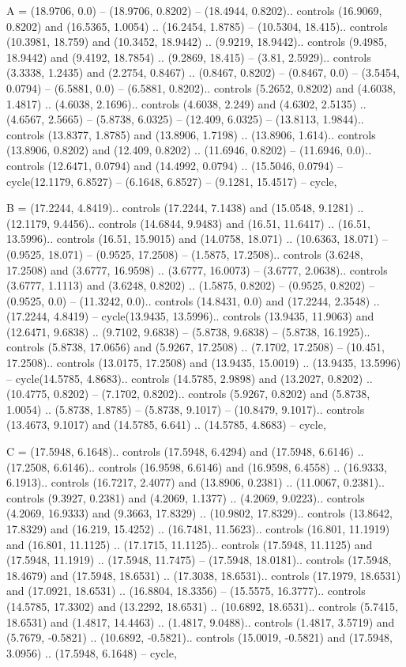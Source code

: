 A = {(18.9706, 0.0) -- (18.9706, 0.8202) -- (18.4944, 0.8202).. controls (16.9069, 0.8202) and (16.5365, 1.0054) .. (16.2454, 1.8785) -- (10.5304, 18.415).. controls (10.3981, 18.759) and (10.3452, 18.9442) .. (9.9219, 18.9442).. controls (9.4985, 18.9442) and (9.4192, 18.7854) .. (9.2869, 18.415) -- (3.81, 2.5929).. controls (3.3338, 1.2435) and (2.2754, 0.8467) .. (0.8467, 0.8202) -- (0.8467, 0.0) -- (3.5454, 0.0794) -- (6.5881, 0.0) -- (6.5881, 0.8202).. controls (5.2652, 0.8202) and (4.6038, 1.4817) .. (4.6038, 2.1696).. controls (4.6038, 2.249) and (4.6302, 2.5135) .. (4.6567, 2.5665) -- (5.8738, 6.0325) -- (12.409, 6.0325) -- (13.8113, 1.9844).. controls (13.8377, 1.8785) and (13.8906, 1.7198) .. (13.8906, 1.614).. controls (13.8906, 0.8202) and (12.409, 0.8202) .. (11.6946, 0.8202) -- (11.6946, 0.0).. controls (12.6471, 0.0794) and (14.4992, 0.0794) .. (15.5046, 0.0794) -- cycle(12.1179, 6.8527) -- (6.1648, 6.8527) -- (9.1281, 15.4517) -- cycle},

B = {(17.2244, 4.8419).. controls (17.2244, 7.1438) and (15.0548, 9.1281) .. (12.1179, 9.4456).. controls (14.6844, 9.9483) and (16.51, 11.6417) .. (16.51, 13.5996).. controls (16.51, 15.9015) and (14.0758, 18.071) .. (10.6363, 18.071) -- (0.9525, 18.071) -- (0.9525, 17.2508) -- (1.5875, 17.2508).. controls (3.6248, 17.2508) and (3.6777, 16.9598) .. (3.6777, 16.0073) -- (3.6777, 2.0638).. controls (3.6777, 1.1113) and (3.6248, 0.8202) .. (1.5875, 0.8202) -- (0.9525, 0.8202) -- (0.9525, 0.0) -- (11.3242, 0.0).. controls (14.8431, 0.0) and (17.2244, 2.3548) .. (17.2244, 4.8419) -- cycle(13.9435, 13.5996).. controls (13.9435, 11.9063) and (12.6471, 9.6838) .. (9.7102, 9.6838) -- (5.8738, 9.6838) -- (5.8738, 16.1925).. controls (5.8738, 17.0656) and (5.9267, 17.2508) .. (7.1702, 17.2508) -- (10.451, 17.2508).. controls (13.0175, 17.2508) and (13.9435, 15.0019) .. (13.9435, 13.5996) -- cycle(14.5785, 4.8683).. controls (14.5785, 2.9898) and (13.2027, 0.8202) .. (10.4775, 0.8202) -- (7.1702, 0.8202).. controls (5.9267, 0.8202) and (5.8738, 1.0054) .. (5.8738, 1.8785) -- (5.8738, 9.1017) -- (10.8479, 9.1017).. controls (13.4673, 9.1017) and (14.5785, 6.641) .. (14.5785, 4.8683) -- cycle},

C = {(17.5948, 6.1648).. controls (17.5948, 6.4294) and (17.5948, 6.6146) .. (17.2508, 6.6146).. controls (16.9598, 6.6146) and (16.9598, 6.4558) .. (16.9333, 6.1913).. controls (16.7217, 2.4077) and (13.8906, 0.2381) .. (11.0067, 0.2381).. controls (9.3927, 0.2381) and (4.2069, 1.1377) .. (4.2069, 9.0223).. controls (4.2069, 16.9333) and (9.3663, 17.8329) .. (10.9802, 17.8329).. controls (13.8642, 17.8329) and (16.219, 15.4252) .. (16.7481, 11.5623).. controls (16.801, 11.1919) and (16.801, 11.1125) .. (17.1715, 11.1125).. controls (17.5948, 11.1125) and (17.5948, 11.1919) .. (17.5948, 11.7475) -- (17.5948, 18.0181).. controls (17.5948, 18.4679) and (17.5948, 18.6531) .. (17.3038, 18.6531).. controls (17.1979, 18.6531) and (17.0921, 18.6531) .. (16.8804, 18.3356) -- (15.5575, 16.3777).. controls (14.5785, 17.3302) and (13.2292, 18.6531) .. (10.6892, 18.6531).. controls (5.7415, 18.6531) and (1.4817, 14.4463) .. (1.4817, 9.0488).. controls (1.4817, 3.5719) and (5.7679, -0.5821) .. (10.6892, -0.5821).. controls (15.0019, -0.5821) and (17.5948, 3.0956) .. (17.5948, 6.1648) -- cycle},

